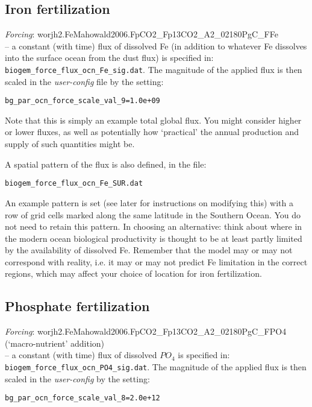 \documentclass[11pt,fleqn]{book} %
\begin{document}

\subsection{Iron fertilization}

\textit{Forcing}: \textsf{\footnotesize worjh2.FeMahowald2006.FpCO2\_Fp13CO2\_A2\_02180PgC\_FFe} \vspace{1pt}
\\-- a constant (with time) flux of dissolved Fe (in addition to whatever Fe dissolves into the surface ocean from the dust flux) is specified in: \texttt{biogem\_force\_flux\_ocn\_Fe\_sig.dat}. The magnitude of the applied flux is then scaled in the \textit{user-config} file by the setting:
\small\begin{verbatim}
bg_par_ocn_force_scale_val_9=1.0e+09
\end{verbatim}\normalsize
Note that this is simply an example total global flux. You might consider higher or lower fluxes, as well as potentially how ‘practical’ the annual production and supply of such quantities might be.

A spatial pattern of the flux is also defined, in the file:
\small\begin{verbatim}
biogem_force_flux_ocn_Fe_SUR.dat
\end{verbatim}\normalsize

An example pattern is set (see later for instructions on modifying this) with a row of grid cells  marked along the same latitude in the Southern Ocean. You do not need to retain this pattern. In choosing an alternative: think about where in the modern ocean biological productivity is thought to be at least partly limited by the availability of dissolved Fe. Remember that the model may or may not correspond with reality, i.e. it may or may not predict Fe limitation in the correct regions, which may affect your choice of location for iron fertilization.


\subsection{Phosphate fertilization}

\textit{Forcing}: \textsf{\footnotesize worjh2.FeMahowald2006.FpCO2\_Fp13CO2\_A2\_02180PgC\_FPO4} (‘macro-nutrient’ addition)
\vspace{1pt}
\\ -- a constant (with time) flux of dissolved \(PO_{4}\) is specified in: \texttt{biogem\_force\_flux\_ocn\_PO4\_sig.dat}. The magnitude of the applied flux is then scaled in the \textit{user-config} by the setting:
\vspace{-2pt}\small\begin{verbatim}
bg_par_ocn_force_scale_val_8=2.0e+12
\end{verbatim}\normalsize\vspace{-2pt}
\end{document}

